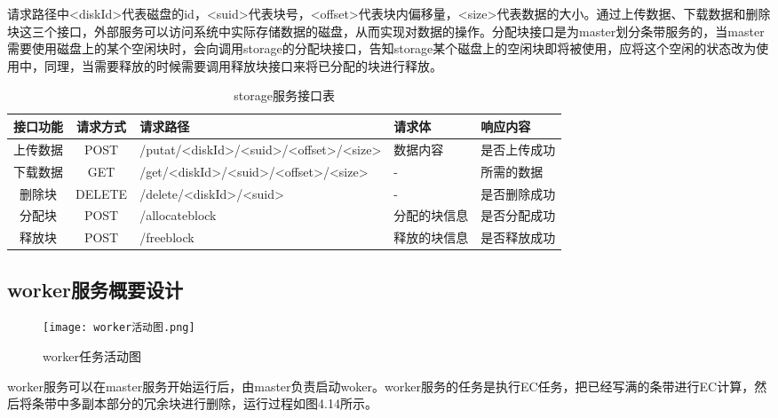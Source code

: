 请求路径中<diskId>代表磁盘的id，<suid>代表块号，<offset>代表块内偏移量，<size>代表数据的大小。通过上传数据、下载数据和删除块这三个接口，外部服务可以访问系统中实际存储数据的磁盘，从而实现对数据的操作。分配块接口是为master划分条带服务的，当master需要使用磁盘上的某个空闲块时，会向调用storage的分配块接口，告知storage某个磁盘上的空闲块即将被使用，应将这个空闲的状态改为使用中，同理，当需要释放的时候需要调用释放块接口来将已分配的块进行释放。

\begin{table}[h]
  \centering
  \vspace{10pt}
  \caption{storage服务接口表}
  \vspace{-15pt}
  \begin{tabular}{ccp{4cm}p{2cm}p{3cm}}
    \toprule
    接口功能   & 请求方式    & 请求路径     & 请求体    & 响应内容                     \\
    \midrule
    上传数据      & POST   & /putat/<diskId>/<suid>\newline/<offset>/<size> & 数据内容      & 是否上传成功\\
    下载数据      & GET    & /get/<diskId>\newline/<suid>/<offset>/<size>   & -            & 所需的数据\\
    删除块        & DELETE & /delete/<diskId>/<suid>                        & -            & 是否删除成功\\
    分配块        & POST   & /allocateblock                                 & 分配的块信息  & 是否分配成功\\
    释放块        & POST   & /freeblock                                     & 释放的块信息  & 是否释放成功\\
    \bottomrule
  \end{tabular}
\end{table}	

\subsection{worker服务概要设计}

\begin{figure}[h]
  \centering
  \texttt{[image: worker活动图.png]}
  \caption{worker任务活动图}
\end{figure}

worker服务可以在master服务开始运行后，由master负责启动woker。worker服务的任务是执行EC任务，把已经写满的条带进行EC计算，然后将条带中多副本部分的冗余块进行删除，运行过程如图4.14所示。

